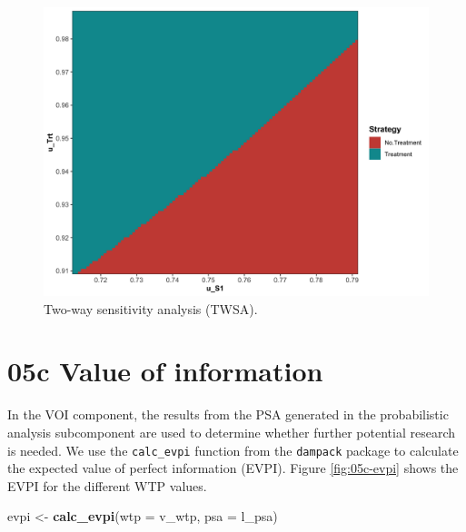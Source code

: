 \documentclass[]{book}
\newenvironment{Shaded}{\begin{snugshade}}{\end{snugshade}}
\newcommand{\DataTypeTok}[1]{\textcolor[rgb]{0.13,0.29,0.53}{#1}}
\newcommand{\KeywordTok}[1]{\textcolor[rgb]{0.13,0.29,0.53}{\textbf{#1}}}
\newcommand{\NormalTok}[1]{#1}
\newcommand{\StringTok}[1]{\textcolor[rgb]{0.31,0.60,0.02}{#1}}
\begin{document}
\begin{figure}

{\centering \includegraphics[width=1\linewidth]{../figs/05b_twsa_lrm_uS1_uTrt_nmb} 

}

\caption{Two-way sensitivity analysis (TWSA).}\label{fig:05b-twsa-lrm-uS1-uTrt-nmb}
\end{figure}

\hypertarget{voi}{%
\section{05c Value of information}\label{voi}}

In the VOI component, the results from the PSA generated in the probabilistic analysis subcomponent are used to determine whether further potential research is needed. We use the \texttt{calc\_evpi} function from the \texttt{dampack} package to calculate the expected value of perfect information (EVPI). Figure \ref{fig:05c-evpi} shows the EVPI for the different WTP values.

\begin{Shaded}
\begin{Highlighting}[]
\NormalTok{evpi <-}\StringTok{ }\KeywordTok{calc_evpi}\NormalTok{(}\DataTypeTok{wtp =}\NormalTok{ v_wtp, }\DataTypeTok{psa =}\NormalTok{ l_psa)}
\end{Highlighting}
\end{Shaded}
\end{document}

